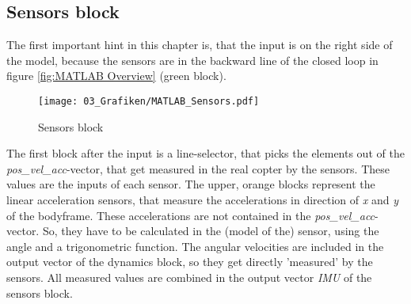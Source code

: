 \subsection{Sensors block}\label{chapter_SENSORS_BLOCK}
The first important hint in this chapter is, that the input is on the right side of the model, because the sensors are in the backward line of the closed loop in figure \ref{fig:MATLAB Overview} (green block).
\begin{figure}[H]
	\centering
		\texttt{[image: 03\_Grafiken/MATLAB\_Sensors.pdf]}
	\caption{Sensors block}
	\label{fig:Sensors block}
\end{figure}
The first block after the input is a line-selector, that picks the elements out of the \textit{pos\_vel\_acc}-vector, that get measured in the real copter by the sensors. These values are the inputs of each sensor. The upper, orange blocks represent the linear acceleration sensors, that measure the accelerations in direction of \textit{x} and \textit{y} of the bodyframe. These accelerations are not contained in the \textit{pos\_vel\_acc}-vector. So, they have to be calculated in the (model of the) sensor, using the angle and a trigonometric function.
The angular velocities are included in the output vector of the dynamics block, so they get directly 'measured' by the sensors. All measured values are combined in the output vector \textit{IMU} of the sensors block. 